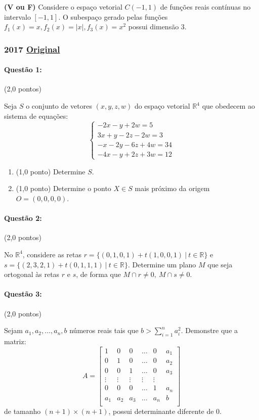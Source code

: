\documentclass[12pt,a4paper]{article}
\newcommand{\original}[1]{\tiny \href{#1}{Original} \normalsize}
\begin{document}
\begin{center} 
    \textbf{(V ou F)} Considere o espaço vetorial $C(-1,1)$ de funções reais contínuas no intervalo $[-1,1]$. O subespaço gerado pelas funções $f_1(x)=x, f_2(x)=|x|, f_3(x)=x^2$ possui dimensão 3.
\end{center}


\newpage

\subsubsection{2017 \original{https://drive.google.com/file/d/1OPWe4V1DsCrERUfZeAieW9IVA57QCQf-/view?usp=sharing}}
\paragraph{Questão 1:} (2,0 pontos)

Seja $S$ o conjunto de vetores $(x,y,z,w)$ do espaço vetorial $\mathbb{R}^4$ que obedecem ao sistema de equações:
$$\begin{cases}
-2x-y+2w=5 \\
3x+y-2z-2w=3 \\
-x-2y-6z+4w=34\\
-4x-y+2z+3w=12
\end{cases}$$
\begin{enumerate}[label=(\alph*)]
\item (1,0 ponto) Determine $S$.
\item (1,0 ponto) Determine o ponto $X \in S$ mais próximo da origem $O=(0,0,0,0)$.
\end{enumerate}
\paragraph{Questão 2:} (2,0 pontos)

No $\mathbb{R}^4$, considere as retas $r=\{(0,1,0,1)+t(1,0,0,1) \ | \ t \in \mathbb{R}\}$ e $s=\{(2,3,2,1)+t(0,1,1,1) \ | \ t \in \mathbb{R}\}$. Determine um plano $M$ que seja ortogonal às retas $r$ e $s$, de forma que $M \cap r \neq 0, \ M \cap s \neq 0$.
\paragraph{Questão 3:} (2,0 pontos)

Sejam $a_1,a_2,\dots,a_n,b$ números reais tais que $b>\sum_{i=1}^n a_i^2$. Demonstre que a matriz:
$$A=\left[ 
\begin{array}{cccccc}
1 & 0 & 0 & \dots & 0 & a_1 \\
0 & 1 & 0 & \dots & 0 & a_2 \\
0 & 0 & 1 & \dots & 0 & a_3 \\
\vdots & \vdots &\vdots & \vdots & \vdots \\
0 & 0 & 0 & \dots & 1 & a_n \\
a_1 & a_2 & a_3 & \dots & a_n & b \\
\end{array}
\right] $$
de tamanho $(n+1)\times(n+1)$, possui determinante diferente de 0.
\end{document}
